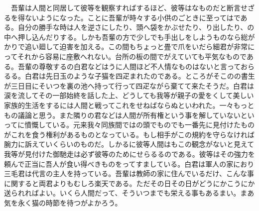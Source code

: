 \documentclass[a5j]{ltjtbook}
\begin{document}
　吾輩は人間と同居して彼等を観察すればするほど、彼等はなものだと断言せざるを得ないようになった。ことに吾輩が時々する小供のごときに至ってはである。自分の勝手な時は人を逆さにしたり、頭へ袋をかぶせたり、り出したり、の中へ押し込んだりする。しかも吾輩の方で少しでも手出しをしようものなら総がかりで追い廻して迫害を加える。この間もちょっと畳で爪をいだら細君が非常にってそれから容易に座敷へれない。台所の板の間でがえていても平気なものである。吾輩の尊敬するの白君などはうに人間ほど不人情なものはないと言っておらるる。白君は先日玉のような子猫を四疋まれたのである。ところがそこのの書生が三日目にそいつを裏の池へ持って行って四疋ながら棄てて来たそうだ。白君は涙を流してその一部始終を話した上、どうしても我等が親子の愛をくして美しい家族的生活をするには人間と戦ってこれをせねばならぬといわれた。一々もっともの議論と思う。また隣りの君などは人間が所有権という事を解していないといってに憤慨している。元来我々同族間ではの頭でものでも一番先に見付けたものがこれを食う権利があるものとなっている。もし相手がこの規約を守らなければ腕力に訴えていくらいのものだ。しかるに彼等人間はもこの観念がないと見えて我等が見付けた御馳走は必ず彼等のためにせらるるのである。彼等はその強力を頼んで正当に吾人が食い得べきものをってすましている。白君は軍人の家におり三毛君は代言の主人を持っている。吾輩は教師の家に住んでいるだけ、こんな事に関すると両君よりもむしろ楽天である。ただその日その日がどうにかこうにか送られればよい。いくら人間だって、そういつまでも栄える事もあるまい。まあ気を永く猫の時節を待つがよかろう。 \newline
\end{document}
